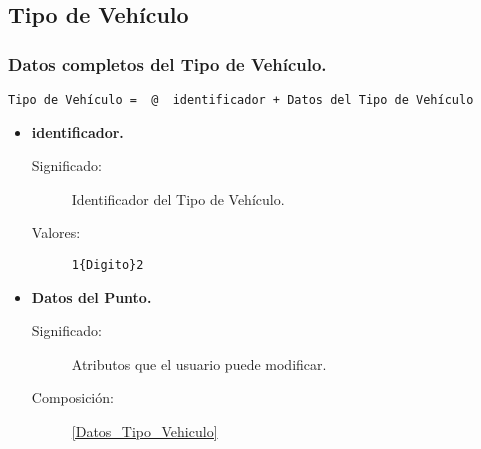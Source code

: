 \subsection{Tipo de Vehículo}

\subsubsection{Datos completos del Tipo de Vehículo.}
\begin{lstlisting}
Tipo de Vehículo =  @  identificador + Datos del Tipo de Vehículo
\end{lstlisting}
	\begin{itemize}
		\item \textbf{identificador.}
			\begin{description}
				\item [Significado:]Identificador del Tipo de Vehículo.
				\item [Valores:]{\begin{lstlisting}
1{Digito}2\end{lstlisting}}
			\end{description}
		\item \textbf{Datos del Punto.}
			\begin{description}
				\item [Significado:] Atributos que el usuario puede modificar.
				\item [Composición:] \ref{Datos_Tipo_Vehiculo}
			\end{description}
	\end{itemize}

